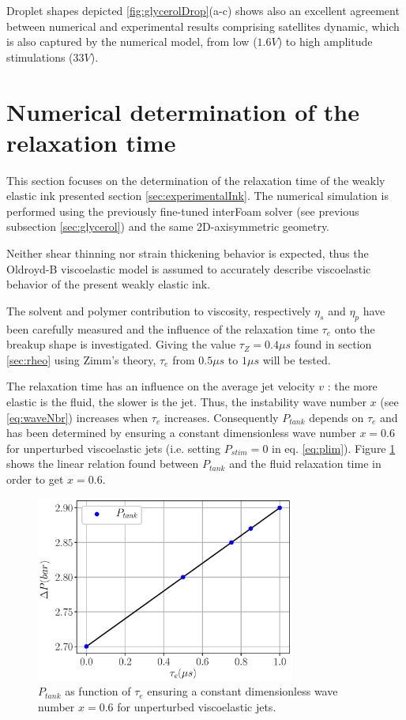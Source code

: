 \documentclass[twocolumn,10pt]{asme2ej}
\begin{document}
Droplet shapes depicted \ref{fig:glycerolDrop}(a-c) shows also an excellent agreement between numerical and experimental results comprising satellites dynamic, which is also captured by the numerical model, from low ($1.6V$) to high amplitude stimulations ($33V$).


\section{Numerical determination of the relaxation time} \label{numericalDetermination}

This section focuses on the determination of the relaxation time of the weakly elastic ink presented section \ref{sec:experimentalInk}. The numerical simulation  is performed using the previously fine-tuned interFoam solver (see previous subsection \ref{sec:glycerol}) and the same 2D-axisymmetric geometry. 

Neither shear thinning nor strain thickening behavior is expected, thus the Oldroyd-B viscoelastic model \cite{oldroyd1950formulation} is assumed to accurately describe viscoelastic behavior of the present weakly elastic ink. 

The solvent and polymer contribution to viscosity, respectively $\eta_s$ and $\eta_p$ have been carefully measured and the influence of the relaxation time $\tau_e$ onto the breakup shape is investigated. Giving the value $\tau_Z= 0.4 \mu s$ found in section  \ref{sec:rheo} using Zimm's theory, $\tau_e$ from $0.5 \mu s$ to $1 \mu s$ will be tested. 

The relaxation time has an influence on the average jet velocity $v$ : the more elastic is the fluid, the slower is the jet. Thus, the instability wave number $x$ (see \ref{eq:waveNbr}) increases when $\tau_e$ increases. Consequently $P_{tank}$ depends on $\tau_e$ and has been determined by ensuring a constant dimensionless wave number $x=0.6$ for unperturbed viscoelastic jets (i.e. setting $P_{stim}=0$ in eq. \ref{eq:plim}). Figure \ref{fig:dP} shows the linear relation found between $P_{tank}$ and the fluid relaxation time in order to get $x=0.6$.

\begin{figure}[H]
    \centering
    \includegraphics[width=8.5cm]{dP.eps}
    \caption{$P_{tank}$ as function of $\tau_e$ ensuring a constant dimensionless wave number $x = 0.6$ for unperturbed viscoelastic jets.}
    \label{fig:dP}
\end{figure}
\end{document}

